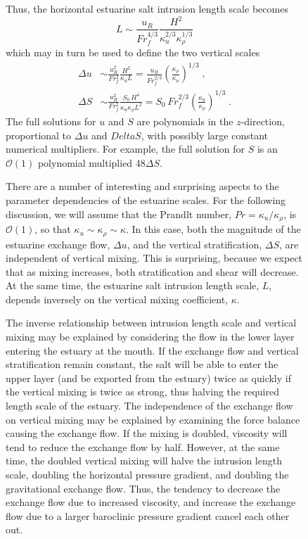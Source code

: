 \documentclass[11pt]{report}
\numberwithin{equation}{section}
\begin{document}
\begin{figure}
Thus, the horizontal estuarine salt intrusion length scale becomes
\begin{equation}
    L \sim \frac{u_R}{Fr_f^{4/3}} \frac{H^2}{\kappa_u^{2/3} \kappa_\rho^{1/3}}
\end{equation}
which may in turn be used to define the two vertical scales
\begin{align}
    \Delta u &\sim \frac{u_R^2}{Fr_f^2}\frac{H^2}{\kappa_u L} 
         = \frac{u_R}{Fr_f^{2/3}} \left( \frac{\kappa_\rho}{\kappa_u} \right)^{1/3} \; ,\\
    \Delta S &\sim \frac{u_R^2}{Fr_f^2}\frac{S_0\,H^4}{\kappa_u \kappa_\rho L^2} 
         =  S_0\,Fr_f^{2/3} \left( \frac{\kappa_u}{\kappa_\rho} \right)^{1/3} \; .
\end{align}
The full solutions for $u$ and $S$ are polynomials in the $z$-direction, proportional to $\Delta u$ and $Delta S$, with possibly large constant numerical multipliers.  For example, the full solution for $S$ is an $\mathcal{O}(1)$ polynomial multiplied $48 \Delta S$.  

There are a number of interesting and surprising aspects to the parameter dependencies of the estuarine scales.  For the following discussion, we will assume that the Prandlt number, $Pr = \kappa_u / \kappa_\rho$, is $\mathcal{O}(1)$, so that $\kappa_u \sim \kappa_\rho \sim \kappa$.  In this case, both the magnitude of the estuarine exchange flow, $\Delta u$, and the vertical stratification, $\Delta S$, are independent of vertical mixing.  This is surprising, because we expect that as mixing increases, both stratification and shear will decrease.  At the same time, the estuarine salt intrusion length scale, $L$, depends inversely on the vertical mixing coefficient, $\kappa$.

The inverse relationship between intrusion length scale and vertical mixing may be explained by considering the flow in the lower layer entering the estuary at the mouth.  If the exchange flow and vertical stratification remain constant, the salt will be able to enter the upper layer (and be exported from the estuary) twice as quickly if the vertical mixing is twice as strong, thus halving the required length scale of the estuary.  The independence of the exchange flow on vertical mixing may be explained by examining the force balance causing the exchange flow.  If the mixing is doubled, viscosity will tend to reduce the exchange flow by half.  However, at the same time, the doubled vertical mixing will halve the intrusion length scale, doubling the horizontal pressure gradient, and doubling the gravitational exchange flow.  Thus, the tendency to decrease the exchange flow due to increased viscosity, and increase the exchange flow due to a larger baroclinic pressure gradient cancel each other out.


\end{figure}
\end{document}
